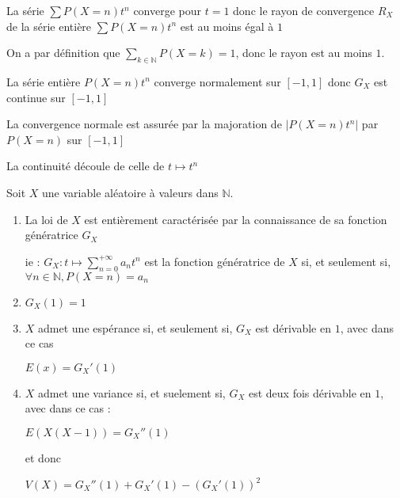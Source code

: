 \documentclass[a4paper,12pt]{book}
\newcommand{\Thr}[2]{\begin{tcolorbox}[sharp corners, colback=white,colframe=red!90!black!75, title=Théorème : #1]#2\end{tcolorbox}}
\newcommand{\Prop}[2]{\begin{tcolorbox}[sharp corners, colback=white,colframe=red!90!black!75, title=Proposition : #1]#2\end{tcolorbox}}
\newcommand{\Pre}[1]{\begin{tcolorbox}[sharp corners, colback=white,colframe=green!60!green!30!black!75, title=Preuve]#1\end{tcolorbox}}
\def\N{\mathbb{N}}
\begin{document}
\Prop{}{La série $\sum P(X=n)t^n$ converge pour $t=1$ donc le rayon de convergence $R_X$ de la série entière $\sum P(X=n)t^n$ est au moins égal à $1$}
\Pre{On a par définition que $\sum\limits_{k\in\N}P(X=k)=1$, donc le rayon est au moins $1$.}
\Prop{}{La série entière $P(X=n)t^n$ converge normalement sur $[-1,1]$ donc $G_X$ est continue sur $[-1,1]$}
\Pre{La convergence normale est assurée par la majoration de $\vert P(X=n)t^n\vert$ par $P(X=n)$ sur $[-1,1]$
\par La continuité découle de celle de $t\mapsto t^n$}
\Thr{}{Soit $X$ une variable aléatoire à valeurs dans $\N$.\begin{enumerate}
\item La loi de $X$ est entièrement caractérisée par la connaissance de sa fonction génératrice $G_X$
\par ie : $G_X:t\mapsto \sum\limits_{n=0}^{+\infty}a_nt^n$ est la fonction génératrice de $X$ si, et seulement si, $\forall n\in \N, P(X=n)=a_n$
\item $G_X(1)=1$
\item $X$ admet une espérance si, et seulement si, $G_X$ est dérivable en $1$, avec dans ce cas \par\begin{center}$E(x) =G_X'(1)$\end{center}
\item $X$ admet une variance si, et suelement si, $G_X$ est deux fois dérivable en $1$, avec dans ce cas :\par\begin{center}$E(X(X-1))=G_X''(1)$\end{center}
\par et donc \par\begin{center}$V(X)=G_X''(1)+G_X'(1)-(G_X'(1))^2$\end{center}
\end{enumerate}}
\end{document}
